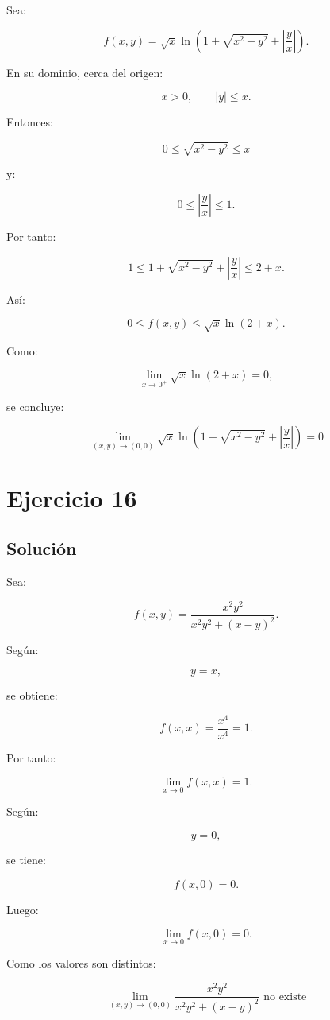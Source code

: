 \documentclass[11pt,a4paper]{article}
\begin{document}
Sea:

\[
f(x,y)
=
\sqrt{x}
\ln\left(
1+\sqrt{x^2-y^2}
+
\left|\frac yx\right|
\right).
\]

En su dominio, cerca del origen:

\[
x>0,
\qquad
|y|\leq x.
\]

Entonces:

\[
0\leq
\sqrt{x^2-y^2}
\leq x
\]

y:

\[
0\leq
\left|\frac yx\right|
\leq1.
\]

Por tanto:

\[
1
\leq
1+\sqrt{x^2-y^2}
+
\left|\frac yx\right|
\leq
2+x.
\]

Así:

\[
0
\leq
f(x,y)
\leq
\sqrt{x}\ln(2+x).
\]

Como:

\[
\lim_{x\to0^+}
\sqrt{x}\ln(2+x)
=
0,
\]

se concluye:

\[
\boxed{
\lim_{(x,y)\to(0,0)}
\sqrt{x}
\ln\left(
1+\sqrt{x^2-y^2}
+
\left|\frac yx\right|
\right)
=
0
}
\]

\section{Ejercicio 16}
\subsection{Solución}

Sea:

\[
f(x,y)
=
\frac{x^2y^2}
{x^2y^2+(x-y)^2}.
\]

Según:

\[
y=x,
\]

se obtiene:

\[
f(x,x)
=
\frac{x^4}{x^4}
=
1.
\]

Por tanto:

\[
\lim_{x\to0}f(x,x)=1.
\]

Según:

\[
y=0,
\]

se tiene:

\[
f(x,0)=0.
\]

Luego:

\[
\lim_{x\to0}f(x,0)=0.
\]

Como los valores son distintos:

\[
\boxed{
\lim_{(x,y)\to(0,0)}
\frac{x^2y^2}
{x^2y^2+(x-y)^2}
\text{ no existe}
}
\]
\end{document}
